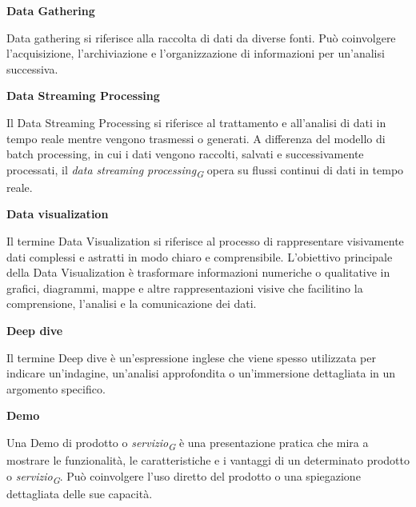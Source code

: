 \documentclass{article}
\begin{document}
\vspace{0.4cm}

\textbf{Data Gathering}

\vspace{0.1cm}

Data gathering si riferisce alla raccolta di dati da diverse fonti. Può coinvolgere l'acquisizione, l'archiviazione e l'organizzazione di informazioni per un'analisi successiva.

\vspace{0.4cm}

\textbf{Data Streaming Processing}

\vspace{0.1cm}

Il Data Streaming Processing si riferisce al trattamento e all'analisi di dati in tempo reale mentre vengono trasmessi o generati. A differenza del modello di batch processing, in cui i dati vengono raccolti, salvati e successivamente processati, il \textit{data streaming processing}\textsubscript{\textit{G}} opera su flussi continui di dati in tempo reale.

\vspace{0.4cm}

\textbf{Data visualization}

\vspace{0.1cm}

Il termine Data Visualization si riferisce al processo di rappresentare visivamente dati complessi e astratti in modo chiaro e comprensibile. L'obiettivo principale della Data Visualization è trasformare informazioni numeriche o qualitative in grafici, diagrammi, mappe e altre rappresentazioni visive che facilitino la comprensione, l'analisi e la comunicazione dei dati. 

\vspace{0.4cm}

\textbf{Deep dive}

\vspace{0.1cm}

Il termine Deep dive è un'espressione inglese che viene spesso utilizzata per indicare un'indagine, un'analisi approfondita o un'immersione dettagliata in un argomento specifico.

\vspace{0.4cm}

\textbf{Demo}

\vspace{0.1cm}

Una Demo di prodotto o \textit{servizio}\textsubscript{\textit{G}} è una presentazione pratica che mira a mostrare le funzionalità, le caratteristiche e i vantaggi di un determinato prodotto o \textit{servizio}\textsubscript{\textit{G}}. Può coinvolgere l'uso diretto del prodotto o una spiegazione dettagliata delle sue capacità.
\end{document}
